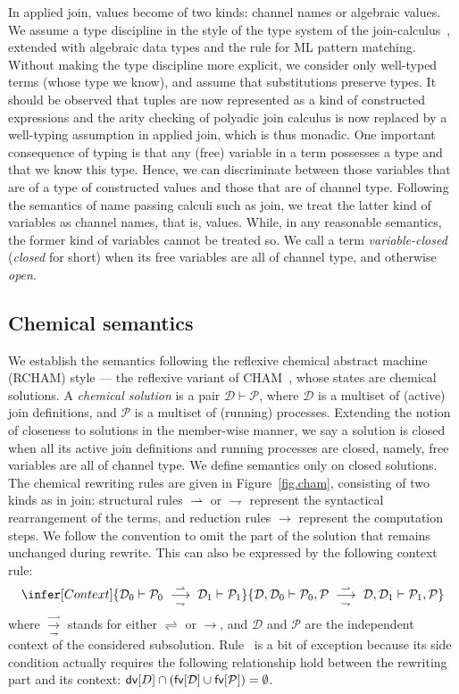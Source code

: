 \documentclass{LMCS}
\newcommand{\rln}[1]{\text{\small\sc #1}}
\newcommand{\rcham}{\textrm{RCHAM}\xspace}
\newcommand{\cham}{\textrm{CHAM}\xspace}
\renewcommand{\_}{\mathord{\rule[-.25ex]{1ex}{.15ex}}}
\newcommand{\soup}[2]{#1\vdash#2}
\newcommand{\heat}{\rightharpoonup}
\newcommand{\cool}{\rightharpoondown}
\newcommand{\reduces}{\longrightarrow}
\newcommand{\hc}{\rightleftharpoons}
\newcommand{\dd}{\mathcal{D}}
\newcommand{\pp}{\mathcal{P}}
\newcommand{\wide}[1]{\mathrel {{}#1{}}}
\newcommand{\hcred}{\overset{\heat}{\underset{\cool}{\reduces}}}
\newcommand{\fv}[1]{\mbox{\sf fv}[#1]}
\newcommand{\dv}[1]{\mbox{\sf dv}[#1]}
\begin{document}
In applied join, values become of two kinds: channel names or
algebraic values.  We assume a type discipline in the style of the
type system of the
join-calculus~\cite{Fournet-Laneve-Maranget-Remy:typing-join},
extended with algebraic data types and the rule for ML pattern
matching.  Without making the type discipline more explicit, we
consider only well-typed terms (whose type we know), and assume that
substitutions preserve types. It should be observed that tuples are
now represented as a kind of constructed expressions and the arity
checking of polyadic join calculus is now replaced by a well-typing
assumption in applied join, which is thus monadic. One important
consequence of typing is that any (free) variable in a term possesses
a type and that we know this type.  Hence, we can discriminate between
those variables that are of a type of constructed values and those
that are of channel type.  Following the semantics of name passing
calculi such as join, we treat the latter kind of variables as channel
names, that is, values.  While, in any reasonable semantics, the
former kind of variables cannot be treated so.  We call a term
\emph{variable-closed} (\emph{closed} for short) when its free
variables are all of channel type, and otherwise \emph{open}.

\subsection{Chemical semantics}
\label{subsec.cham}

We establish the semantics following the reflexive chemical abstract
machine (\rcham) style --- the reflexive variant of
\cham~\cite{CHAM92}, whose states are chemical solutions. A
\emph{chemical solution} is a pair $\soup{\dd}{\pp}$,
where $\dd$ is a multiset of (active) join definitions, and
$\pp$ is a multiset of (running) processes.  Extending the
notion of closeness to solutions in the member-wise manner, we say a
solution is closed when all its active join definitions and running
processes are closed, namely, free variables are all of channel type.
We define semantics only on closed solutions. The chemical rewriting
rules are given in Figure~\ref{fig.cham},
consisting of two kinds as
in join: structural rules $\heat$ or $\cool$ represent the syntactical
rearrangement of the terms, and reduction rules $\reduces$ represent
the computation steps. We follow the convention to omit the part of
the solution that remains unchanged during rewrite.
This can also be expressed by the following context rule: $$
\infer[Context]
{\soup{\dd_0}{\pp_0} \wide\hcred \soup{\dd_1}{\pp_1}} {\soup{\dd,
    \dd_0}{\pp_0, \pp} \wide\hcred \soup{\dd, \dd_1}{\pp_1, \pp}} $$
where
$\hcred$ stands for either $\hc$ or $\reduces$, and
$\dd$ and $\pp$ are the independent context of the considered
subsolution. Rule~\rln{Str-Def} is a bit of exception because its side
condition actually requires the following relationship hold between
the rewriting part and its context: $\dv{D} \cap
(\fv{\dd}\cup\fv{\pp}) = \emptyset$.
\end{document}
